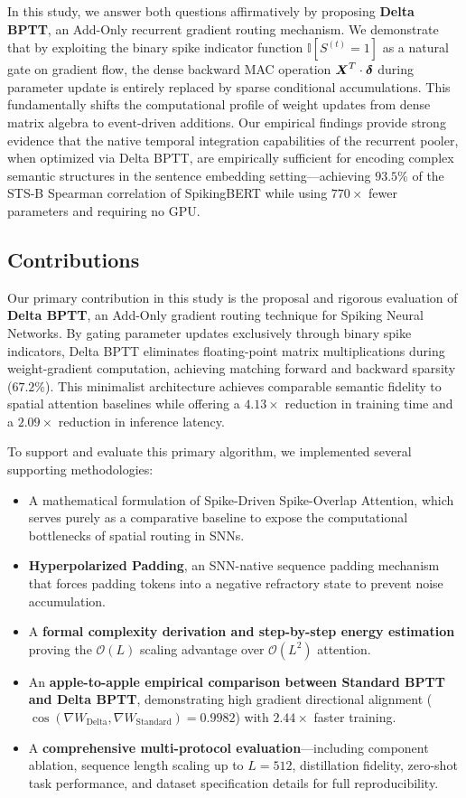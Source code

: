 \documentclass[10pt,journal,compsoc]{IEEEtran}
\begin{document}
In this study, we answer both questions affirmatively by proposing \textbf{Delta BPTT}, an Add-Only recurrent gradient routing mechanism. We demonstrate that by exploiting the binary spike indicator function $\mathbb{I}[S^{(t)} = 1]$ as a natural gate on gradient flow, the dense backward MAC operation $\boldsymbol{X}^T \cdot \boldsymbol{\delta}$ during parameter update is entirely replaced by sparse conditional accumulations. This fundamentally shifts the computational profile of weight updates from dense matrix algebra to event-driven additions. Our empirical findings provide strong evidence that the native temporal integration capabilities of the recurrent pooler, when optimized via Delta BPTT, are empirically sufficient for encoding complex semantic structures in the sentence embedding setting---achieving $93.5\%$ of the STS-B Spearman correlation of SpikingBERT \cite{bal2024spikingbert} while using $770\times$ fewer parameters and requiring no GPU.

\subsection{Contributions}
Our primary contribution in this study is the proposal and rigorous evaluation of \textbf{Delta BPTT}, an Add-Only gradient routing technique for Spiking Neural Networks. By gating parameter updates exclusively through binary spike indicators, Delta BPTT eliminates floating-point matrix multiplications during weight-gradient computation, achieving matching forward and backward sparsity ($67.2\%$). This minimalist architecture achieves comparable semantic fidelity to spatial attention baselines while offering a $4.13\times$ reduction in training time and a $2.09\times$ reduction in inference latency.

To support and evaluate this primary algorithm, we implemented several supporting methodologies:
\begin{itemize}
    \item A mathematical formulation of Spike-Driven Spike-Overlap Attention, which serves purely as a comparative baseline to expose the computational bottlenecks of spatial routing in SNNs.
    \item \textbf{Hyperpolarized Padding}, an SNN-native sequence padding mechanism that forces padding tokens into a negative refractory state to prevent noise accumulation.
    \item A \textbf{formal complexity derivation and step-by-step energy estimation} proving the $\mathcal{O}(L)$ scaling advantage over $\mathcal{O}(L^2)$ attention.
    \item An \textbf{apple-to-apple empirical comparison between Standard BPTT and Delta BPTT}, demonstrating high gradient directional alignment ($\cos(\nabla W_{\text{Delta}}, \nabla W_{\text{Standard}}) = 0.9982$) with $2.44\times$ faster training.
    \item A \textbf{comprehensive multi-protocol evaluation}---including component ablation, sequence length scaling up to $L=512$, distillation fidelity, zero-shot task performance, and dataset specification details for full reproducibility.
\end{itemize}
\end{document}
